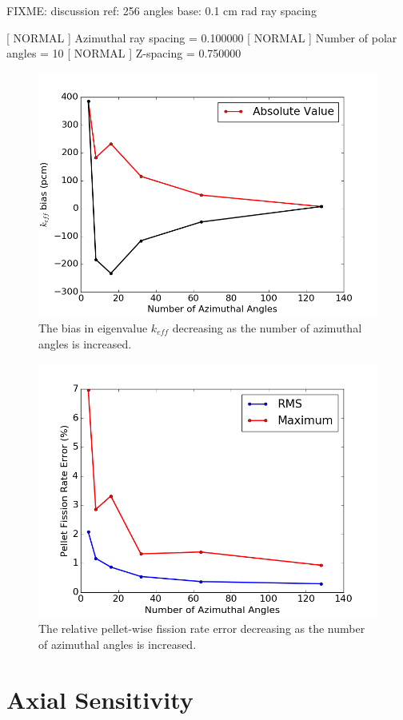 FIXME: discussion
ref: 256 angles
base: 0.1 cm rad ray spacing


[  NORMAL ]  Azimuthal ray spacing = 0.100000
[  NORMAL ]  Number of polar angles = 10
[  NORMAL ]  Z-spacing = 0.750000


\begin{figure}[h!]
	\centering
	\includegraphics[width=0.7\linewidth]{figures/results/sensitivity/az_angles_pcm.png}
	\caption[]{The bias in eigenvalue $k_{\textit{eff}}$ decreasing as the number of azimuthal angles is increased.}
	\label{fig:az-angles-pcm}
\end{figure}
\begin{figure}[h!]
	\centering
	\includegraphics[width=0.7\linewidth]{figures/results/sensitivity/az_angles_fr.png}
	\caption[]{The relative pellet-wise fission rate error decreasing as the number of azimuthal angles is increased.}
	\label{fig:az-angles-fr}
\end{figure}


\section{Axial Sensitivity}
\label{sec:axial-sensitivity}

